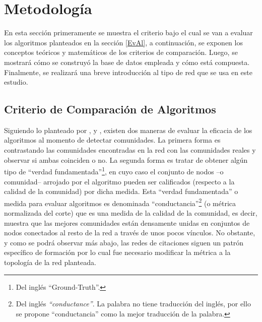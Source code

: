 \documentclass[12pt,letter]{article}
\begin{document}
\section{Metodología}


En esta sección primeramente se muestra el criterio bajo el cual se van a evaluar los algoritmos planteados en la sección \ref{EvAl}, a continuación, se exponen los conceptos teóricos y matemáticos de los criterios de comparación. Luego, se mostrará cómo se construyó la base de datos empleada y cómo está compuesta. Finalmente, se realizará una breve introducción al tipo de red que se usa en este estudio.

\subsection{Criterio de Comparación de Algoritmos} \label{Criterio}

Siguiendo lo planteado por \cite{Gleich}, \cite{Leskovec1, Leskovec2} y \cite{Yang}, existen dos maneras de evaluar la eficacia de los algoritmos al momento de detectar comunidades. La primera forma es contrastando las comunidades encontradas en la red con las comunidades reales y observar si ambas coinciden o no. La segunda forma es tratar de obtener algún tipo de ``verdad fundamentada''\footnote{Del inglés ``Ground-Truth''.}, en cuyo caso el conjunto de nodos --o comunidad-- arrojado por el algoritmo pueden ser calificados (respecto a la calidad de la comunidad) por dicha medida. Esta ``verdad fundamentada'' o medida para evaluar algoritmos es denominada ``conductancia''\footnote{Del inglés \emph{``conductance''}. La palabra no tiene traducción del inglés, por ello se propone ``conductancia'' como la mejor traducción de la palabra.} (o métrica normalizada del corte) que es una medida de la calidad de la comunidad, es decir, muestra que las mejores comunidades están densamente unidas en conjuntos de nodos conectados al resto de la red a través de unos pocos vínculos. No obstante, y como se podrá observar más abajo, las redes de citaciones siguen un patrón específico de formación por lo cual fue necesario modificar la métrica a la topología de la red planteada.

\vspace{0.5cm}
\end{document}
